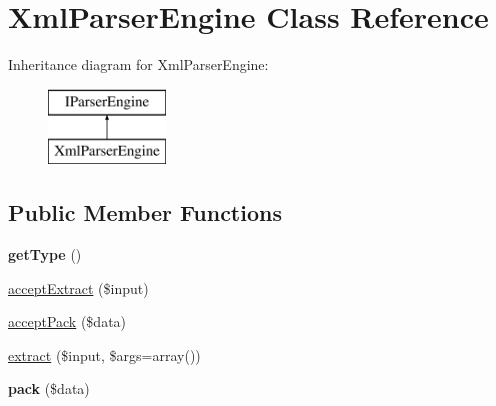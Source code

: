 \hypertarget{class_utopia_1_1_components_1_1_data_parser_1_1_xml_parser_engine}{
\section{XmlParserEngine Class Reference}
\label{class_utopia_1_1_components_1_1_data_parser_1_1_xml_parser_engine}
}
Inheritance diagram for XmlParserEngine:\begin{figure}[H]
\begin{center}
\leavevmode
\includegraphics[height=2.000000cm]{class_utopia_1_1_components_1_1_data_parser_1_1_xml_parser_engine}
\end{center}
\end{figure}
\subsection*{Public Member Functions}
\begin{DoxyCompactItemize}
\item 
\hypertarget{class_utopia_1_1_components_1_1_data_parser_1_1_xml_parser_engine_a830b5c75df72b32396701bc563fbe3c7}{
{\bfseries getType} ()}
\label{class_utopia_1_1_components_1_1_data_parser_1_1_xml_parser_engine_a830b5c75df72b32396701bc563fbe3c7}

\item 
\hyperlink{class_utopia_1_1_components_1_1_data_parser_1_1_xml_parser_engine_aa40a2c570a65e6f8d8a55af28cd6e595}{acceptExtract} (\$input)
\item 
\hyperlink{class_utopia_1_1_components_1_1_data_parser_1_1_xml_parser_engine_a0e48ec53c3dc0fdc3918ca54041744e7}{acceptPack} (\$data)
\item 
\hyperlink{class_utopia_1_1_components_1_1_data_parser_1_1_xml_parser_engine_a3dffec125cfe41516f0ae24acdb87901}{extract} (\$input, \$args=array())
\item 
\hypertarget{class_utopia_1_1_components_1_1_data_parser_1_1_xml_parser_engine_ab1243b982f1390bcc329bcefa5dda6a3}{
{\bfseries pack} (\$data)}
\label{class_utopia_1_1_components_1_1_data_parser_1_1_xml_parser_engine_ab1243b982f1390bcc329bcefa5dda6a3}

\end{DoxyCompactItemize}


